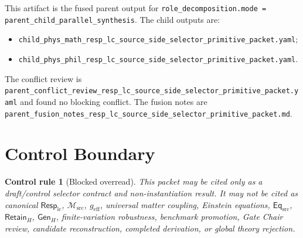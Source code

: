 \documentclass[11pt]{article}
\newcommand{\EqSrc}{\mathsf{Eq}_{\mathrm{src}}}
\newcommand{\RetainH}{\mathsf{Retain}_{H}}
\newcommand{\GenH}{\mathsf{Gen}_{H}}
\newcommand{\Msrc}{\mathcal{M}_{\mathrm{src}}}
\newcommand{\RespLC}{\mathsf{Resp}_{\mathrm{lc}}}
\newcommand{\geff}{g_{\mathrm{eff}}}
\newtheorem{controlrule}{Control rule}
\begin{document}
This artifact is the fused parent output for
\texttt{role\_decomposition.mode = parent\_child\_parallel\_synthesis}.
The child outputs are:
\begin{itemize}
    \item \texttt{child\_phys\_math\_resp\_lc\_source\_side\_selector\_primitive\_packet.yaml};
    \item \texttt{child\_phys\_phil\_resp\_lc\_source\_side\_selector\_primitive\_packet.yaml}.
\end{itemize}
The conflict review is
\texttt{parent\_conflict\_review\_resp\_lc\_source\_side\_selector\_primitive\_packet.yaml}
and found no blocking conflict. The fusion notes are
\texttt{parent\_fusion\_notes\_resp\_lc\_source\_side\_selector\_primitive\_packet.md}.

\section{Control Boundary}

\begin{controlrule}[Blocked overread]
This packet may be cited only as a draft/control selector contract and
non-instantiation result. It may not be cited as canonical
\(\RespLC\), \(\Msrc\), \(\geff\), universal matter coupling, Einstein
equations, \(\EqSrc\), \(\RetainH\), \(\GenH\), finite-variation
robustness, benchmark promotion, Gate Chair review, candidate
reconstruction, completed derivation, or global theory rejection.
\end{controlrule}
\end{document}
